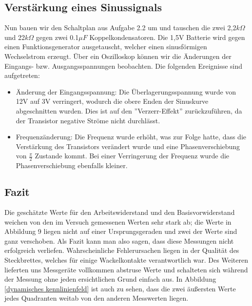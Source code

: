 \subsection{Verstärkung eines Sinussignals}

Nun bauen wir den Schaltplan aus Aufgabe 2.2 um und tauschen die zwei 2,2\(k\Omega\) und 22\(k\Omega\) gegen zwei 0.1\(\mu F\) Koppelkondensatoren. Die 1,5V Batterie wird gegen einen Funktionsgenerator ausgetauscht, welcher einen sinusförmigen Wechselstrom erzeugt. Über ein Oszilloskop können wir die Änderungen der Eingangs- bzw. Ausgangsspannungen beobachten. Die folgenden Ereignisse sind aufgetreten:

\begin{itemize}
\item Änderung der Eingangsspannung: Die Überlagerungsspannung wurde von 12V auf 3V verringert, wodurch die obere Enden der Sinuskurve abgeschnitten wurden. Dies ist auf den ''Verzerr-Effekt'' zurückzuführen, da der Transistor negative Ströme nicht durchlässt.
\item Frequenzänderung: Die Frequenz wurde erhöht, was zur Folge hatte, dass die Verstärkung des Transistors verändert wurde und eine Phasenverschiebung von \(\frac{\pi}{2}\) Zustande kommt. Bei einer Verringerung der Frequenz wurde die Phasenverschiebung ebenfalls kleiner.
\end{itemize}

\subsection{Fazit}

Die geschätzte Werte für den Arbeitswiderstand und den Basisvorwiderstand weichen von den im Versuch gemessenen Werten sehr stark ab; die Werte in Abbildung 9 liegen nicht auf einer Ursprungsgeraden und zwei der Werte sind ganz verschoben. Als Fazit kann man also sagen, dass diese Messungen nicht erfolgreich verliefen. Wahrscheinliche Fehlerursachen liegen in der Qualität des Steckbrettes, welches für einige Wackelkontakte verantwortlich war. Des Weiteren lieferten uns Messgeräte vollkommen abstruse Werte und schalteten sich während der Messung ohne jeden ersichtlichen Grund einfach aus. In Abbildung \ref{dynamisches kennlinienfeld} ist auch zu sehen, dass die zwei äußersten Werte jedes Quadranten weitab von den anderen Messwerten liegen.\\

